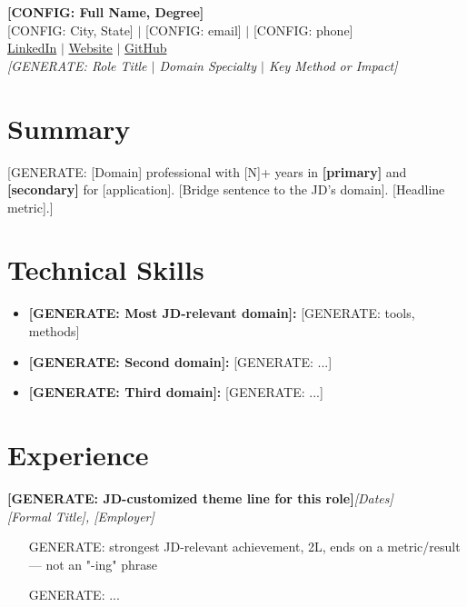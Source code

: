 \documentclass[10pt,letterpaper]{article}
\newcommand{\daterange}[1]{\hfill\textnormal{\textit{#1}}}
\newcommand{\role}[4]{\textbf{#1}\daterange{#4}\\ \textit{#2, #3}\par\vspace{1pt}}
\begin{document}
\begin{center}
  {\LARGE\bfseries [CONFIG: Full Name, Degree]}\\[2pt]
  [CONFIG: City, State] $\vert$ [CONFIG: email] $\vert$ [CONFIG: phone]\\
  \href{[CONFIG: LinkedIn URL]}{LinkedIn} $\vert$ \href{[CONFIG: website URL]}{Website} $\vert$ \href{[CONFIG: GitHub URL]}{GitHub}\\[2pt]
  \textit{[GENERATE: Role Title $\vert$ Domain Specialty $\vert$ Key Method or Impact]}
\end{center}

\section{Summary}
[GENERATE: [Domain] professional with [N]+ years in \textbf{[primary]} and \textbf{[secondary]} for [application]. [Bridge sentence to the JD's domain]. [Headline metric].]

\section{Technical Skills}
\begin{itemize}
  \item \textbf{[GENERATE: Most JD-relevant domain]:} [GENERATE: tools, methods]
  \item \textbf{[GENERATE: Second domain]:} [GENERATE: ...]
  \item \textbf{[GENERATE: Third domain]:} [GENERATE: ...]
\end{itemize}

\section{Experience}
\role{[GENERATE: JD-customized theme line for this role]}{[Formal Title]}{[Employer]}{[Dates]}
\begin{itemize}
  \item [GENERATE: strongest JD-relevant achievement, 2L, ends on a metric/result — not an "-ing" phrase]
  \item [GENERATE: ...]
\end{itemize}
\end{document}
